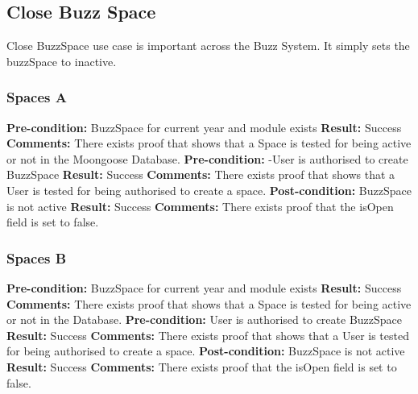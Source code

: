 
\subsection{ Close Buzz Space}

Close BuzzSpace use case is important across the Buzz System. It simply sets the buzzSpace to inactive.  \newline 

\subsubsection{Spaces A}
\textbf{Pre-condition:}  BuzzSpace for current year and module exists  \newline
\textbf{Result:}  Success \newline
\textbf{Comments:}  There exists  proof that shows that a  Space is tested for being active or not in the Moongoose Database.\newline
\textbf{Pre-condition:}  -User is authorised to create BuzzSpace  \newline
\textbf{Result:}  Success \newline
\textbf{Comments:}  There exists  proof that shows that a  User is tested for being authorised to create a space.\newline
\textbf{Post-condition:}  BuzzSpace is not active  \newline
\textbf{Result:}  Success \newline
\textbf{Comments:}  There exists  proof that the isOpen field is set to false.\newline
\subsubsection{Spaces B}
\textbf{Pre-condition:}  BuzzSpace for current year and module exists  \newline
\textbf{Result:}  Success \newline
\textbf{Comments:}  There exists  proof that shows that a  Space is tested for being active or not in the Database.\newline 
\textbf{Pre-condition:}  User is authorised to create BuzzSpace  \newline
\textbf{Result:}  Success \newline
\textbf{Comments:}  There exists  proof that shows that a  User is tested for being authorised to create a space.\newline
\textbf{Post-condition:}  BuzzSpace is not active  \newline
\textbf{Result:}  Success \newline
\textbf{Comments:}  There exists  proof that the isOpen field is set to false. \newline


